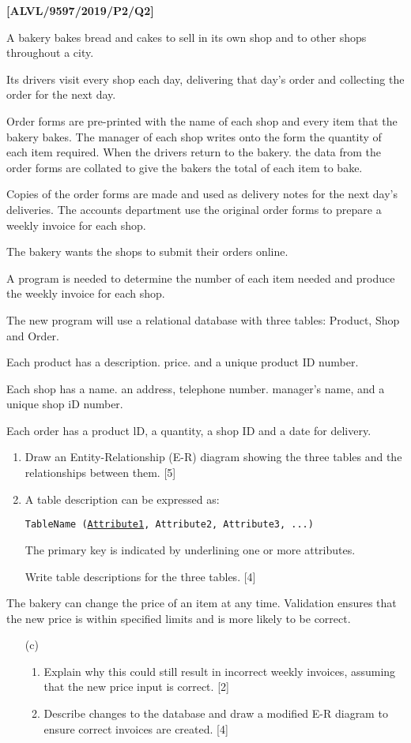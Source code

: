 \item \textbf{{[}ALVL/9597/2019/P2/Q2{]} }

A bakery bakes bread and cakes to sell in its own shop and to other
shops throughout a city. 

Its drivers visit every shop each day, delivering that day\textquoteright s
order and collecting the order for the next day. 

Order forms are pre-printed with the name of each shop and every item
that the bakery bakes. The manager of each shop writes onto the form
the quantity of each item required. When the drivers return to the
bakery. the data from the order forms are collated to give the bakers
the total of each item to bake. 

Copies of the order forms are made and used as delivery notes for
the next day\textquoteright s deliveries. The accounts department
use the original order forms to prepare a weekly invoice for each
shop.

The bakery wants the shops to submit their orders online. 

A program is needed to determine the number of each item needed and
produce the weekly invoice for each shop.

The new program will use a relational database with three tables:
Product, Shop and Order. 

Each product has a description. price. and a unique product ID number. 

Each shop has a name. an address, telephone number. manager's name,
and a unique shop iD number. 

Each order has a product lD, a quantity, a shop ID and a date for
delivery. 
\begin{enumerate}
\item Draw an Entity-Relationship (E-R) diagram showing the three tables
and the relationships between them. \hfill{}{[}5{]}
\item A table description can be expressed as: 

\texttt{TableName (}\texttt{\uline{Attribute1}}\texttt{, Attribute2,
Attribute3, ...) }

The primary key is indicated by underlining one or more attributes. 

Write table descriptions for the three tables. \hfill{}{[}4{]}
\end{enumerate}
The bakery can change the price of an item at any time. Validation
ensures that the new price is within specified limits and is more
likely to be correct.
\begin{enumerate}
\item[(c)] {}
\begin{enumerate}
\item Explain why this could still result in incorrect weekly invoices,
assuming that the new price input is correct. \hfill{}{[}2{]}
\item Describe changes to the database and draw a modified E-R diagram to
ensure correct invoices are created. \hfill{}{[}4{]}
\end{enumerate}
\end{enumerate}
